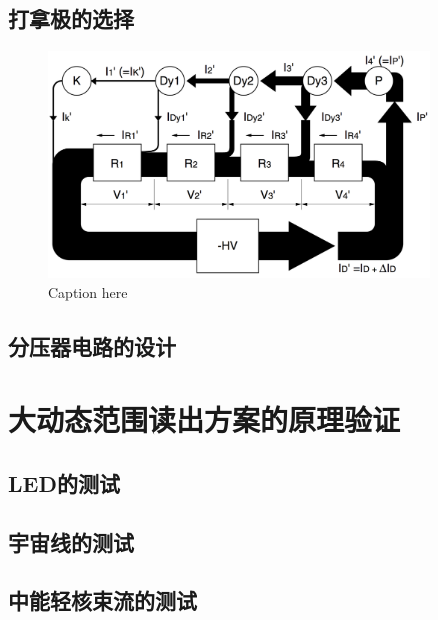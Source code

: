 \subsection{打拿极的选择}
\label{sec:dynamic_range:dynode_selection}

\begin{figure}[tb]
	\centering
	\includegraphics[width=0.9\textwidth]{chap/dynamic_range/fig/pmt_current_distribution_hamamatsu}
	\caption{Caption here}
	\label{fig:figure1}
\end{figure}

\subsection{分压器电路的设计}
\label{sec:dynamic_range:hv_divider}

\section{大动态范围读出方案的原理验证}
\label{sec:dynamic_range:verification}

\subsection{LED的测试}
\label{sec:dynamic_range:led}

\subsection{宇宙线的测试}
\label{sec:dynamic_range:cosmic_ray}

\subsection{中能轻核束流的测试}
\label{sec:dynamic_range:ion_beam}
